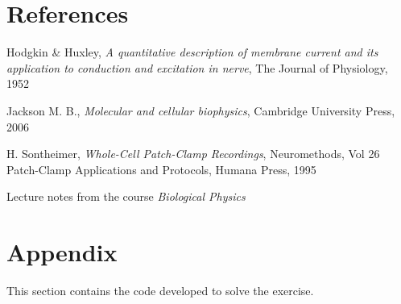 \documentclass[a4paper]{article}
\begin{document}
\section{References}

Hodgkin \& Huxley, \emph{A quantitative description of membrane current and its application to conduction and excitation in nerve}, The Journal of Physiology, 1952

Jackson M. B., \emph{Molecular and cellular biophysics}, Cambridge University Press, 2006

H. Sontheimer, \emph{Whole-Cell Patch-Clamp Recordings}, Neuromethods, Vol 26 Patch-Clamp Applications and Protocols, Humana Press, 1995

Lecture notes from the course \emph{Biological Physics}

\newpage
\section{Appendix}
This section contains the code developed to solve the exercise.


\end{document}
